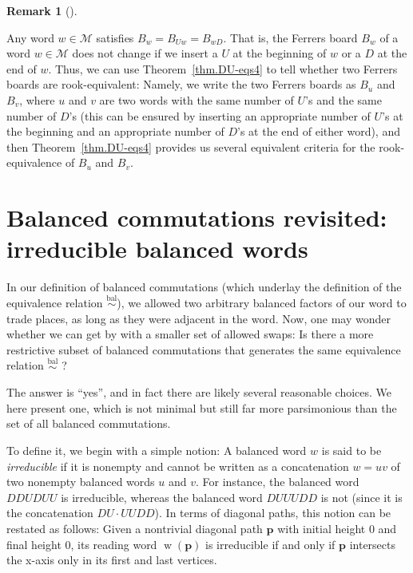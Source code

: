 \documentclass[numbers=enddot,12pt,final,onecolumn,notitlepage]{scrartcl}%
\theoremstyle{definition}
\newtheorem{remk}[theo]{Remark}
\newenvironment{remark}[1][]
{\begin{remk}[#1]\begin{leftbar}}
{\end{leftbar}\end{remk}}
\newcommand{\M}{\mathcal{M}}
\newcommand{\pp}{\mathbf{p}}
\newcommand{\w}{\operatorname{w}}
\newcommand{\balsim}{\overset{\operatorname*{bal}}{\sim}}
\newcommand{\tup}[1]{\left( #1 \right)}
\begin{document}

\begin{remark}
\label{rmk.rook.as-crit}
Any word $w \in \M$ satisfies $B_w = B_{Uw} = B_{wD}$.
That is, the Ferrers board $B_w$ of a word $w \in \M$ does not change if we insert a $U$ at the beginning of $w$ or a $D$ at the end of $w$.
Thus, we can use Theorem~\ref{thm.DU-eqs4} to tell whether two Ferrers boards are rook-equivalent:
Namely, we write the two Ferrers boards as $B_u$ and $B_v$, where $u$ and $v$ are two words with the same number of $U$'s and the same number of $D$'s (this can be ensured by inserting an appropriate number of $U$'s at the beginning and an appropriate number of $D$'s at the end of either word), and then Theorem~\ref{thm.DU-eqs4} provides us several equivalent criteria for the rook-equivalence of $B_u$ and $B_v$.
\end{remark}


\section{Balanced commutations revisited: irreducible balanced words}\label{sec:irredbal}

In our definition of balanced commutations (which underlay the definition of the equivalence relation $\balsim$), we allowed two arbitrary balanced factors of our word to trade places, as long as they were adjacent in the word.
Now, one may wonder whether we can get by with a smaller set of allowed swaps:
Is there a more restrictive subset of balanced commutations that generates the same equivalence relation $\balsim$ ?

The answer is ``yes'', and in fact there are likely several reasonable choices.
We  here present one, which is not minimal but still far more parsimonious than the set of all balanced commutations.

To define it, we begin with a simple notion:
A balanced word $w$ is said to be \emph{irreducible} if it is nonempty and cannot be written as a concatenation $w = uv$ of two nonempty balanced words $u$ and $v$.
For instance, the balanced word $DDUDUU$ is irreducible, whereas the balanced word $DUUUDD$ is not (since it is the concatenation $DU \cdot UUDD$).
In terms of diagonal paths, this notion can be restated as follows:
Given a nontrivial diagonal path $\pp$ with initial height $0$ and final height $0$, its reading word $\w\tup{\pp}$ is irreducible if and only if $\pp$ intersects the x-axis only in its first and last vertices.
\end{document}
